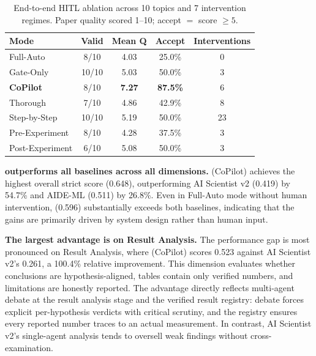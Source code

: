 \begin{table}[t]
\centering
\caption{End-to-end HITL ablation across 10 topics and 7 intervention regimes.
Paper quality scored 1--10; accept $=$ score $\geq 5$.}
\label{tab:hitl-summary}
\small
\begin{tabularx}{\textwidth}{@{}lCCCC@{}}
\toprule
\textbf{Mode} & \textbf{Valid} & \textbf{Mean Q} & \textbf{Accept} & \textbf{Interventions} \\
\midrule
Full-Auto        & 8/10  & 4.03          & 25.0\%          & 0  \\
Gate-Only        & 10/10 & 5.03          & 50.0\%          & 3  \\
\textbf{CoPilot} & 8/10  & \textbf{7.27} & \textbf{87.5\%} & 6 \\
Thorough         & 7/10  & 4.86          & 42.9\%          & 8 \\
Step-by-Step     & 10/10 & 5.19          & 50.0\%          & 23 \\
Pre-Experiment   & 8/10  & 4.28          & 37.5\%          & 3 \\
Post-Experiment  & 6/10  & 5.08          & 50.0\%          & 3 \\
\bottomrule
\end{tabularx}
\end{table}

\noindent \textbf{\system{} outperforms all baselines across all dimensions.} \system{} (CoPilot) achieves the highest overall strict score (0.648), outperforming AI Scientist v2 (0.419) by 54.7\% and AIDE-ML (0.511) by 26.8\%. Even in Full-Auto mode without human intervention, \system{} (0.596) substantially exceeds both baselines, indicating that the gains are primarily driven by system design rather than human input.

\noindent \textbf{The largest advantage is on Result Analysis.} The performance gap is most pronounced on Result Analysis, where \system{} (CoPilot) scores 0.523 against AI Scientist v2's 0.261, a 100.4\% relative improvement. This dimension evaluates whether conclusions are hypothesis-aligned, tables contain only verified numbers, and limitations are honestly reported. The advantage directly reflects multi-agent debate at the result analysis stage and the verified result registry: debate forces explicit per-hypothesis verdicts with critical scrutiny, and the registry ensures every reported number traces to an actual measurement. In contrast, AI Scientist v2's single-agent analysis tends to oversell weak findings without cross-examination.

